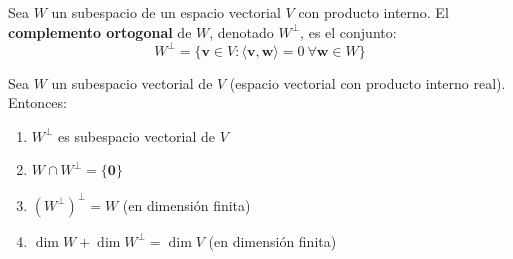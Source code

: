 \begin{definition}
Sea $W$ un subespacio de un espacio vectorial $V$ con producto interno. El \textbf{complemento ortogonal} de $W$, denotado $W^\perp$, es el conjunto:
\[
W^\perp = \{ \mathbf{v} \in V : \langle \mathbf{v}, \mathbf{w} \rangle = 0 \ \forall \mathbf{w} \in W \}
\]
\end{definition}

\begin{theorem}
Sea $W$ un subespacio vectorial de $V$ (espacio vectorial con producto interno real). Entonces:
\begin{enumerate}
    \item $W^\perp$ es subespacio vectorial de $V$
    \item $W \cap W^\perp = \{ \mathbf{0} \}$
    \item $(W^\perp)^\perp = W$ (en dimensión finita)
    \item $\dim W + \dim W^\perp = \dim V$ (en dimensión finita)
\end{enumerate}
\end{theorem}

